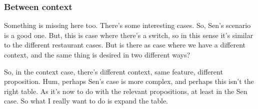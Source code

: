 \documentclass[10pt]{article}
\begin{document}
\newpage

\subsubsection{Between context}
\label{sec:between-context}


Something is missing here too.
There's some interesting cases.
So, Sen's scenario is a good one.
But, this is case where there's a switch, so in this sense it's similar to the different restaurant cases.
But is there as case where we have a different context, and the same thing is desired in two different ways?

So, in the context case, there's different context, same feature, different proposition.
Hum, perhaps Sen's case is more complex, and perhaps this isn't the right table.
As it's now to do with the relevant propositions, at least in the Sen case.
So what I really want to do is expand the table.


%
\end{document}

